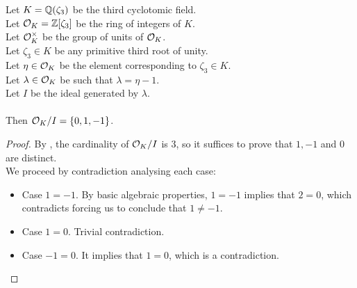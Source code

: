 \begin{lemma}
    \label{lmm:univ_quot}
    \leanok
    Let $K = \mathbb{Q}(\zeta_3)$ be the third cyclotomic field. \\
    Let $\mathcal{O}_K = \mathbb{Z}[\zeta_3]$ be the ring of integers of $K$. \\
    Let $\mathcal{O}^\times_K$ be the group of units of $\mathcal{O}_K$. \\
    Let $\zeta_3 \in K$ be any primitive third root of unity. \\
    Let $\eta \in \mathcal{O}_K$ be the element corresponding to $\zeta_3 \in K$. \\
    Let $\lambda \in \mathcal{O}_K$ be such that $\lambda = \eta -1$. \\
    Let $I$ be the ideal generated by $\lambda$. \\\\
    Then $\mathcal{O}_K / I = \left\{0, 1, -1\right\}$.
\end{lemma}
\begin{proof}
    \leanok
    By , the cardinality of $\mathcal{O}_K / I$ is $3$,
    so it suffices to prove that $1,-1$ and $0$ are distinct.\\
    We proceed by contradiction analysing each case:
    \begin{itemize}
        \item Case $1 = -1$. By basic algebraic properties, $1 = -1$ implies that $2 = 0$,
              which contradicts  forcing us to conclude that $1 \neq -1$.
        \item Case $1 = 0$. Trivial contradiction.
        \item Case $-1 = 0$. It implies that $1 = 0$, which is a contradiction.
    \end{itemize}
\end{proof}

